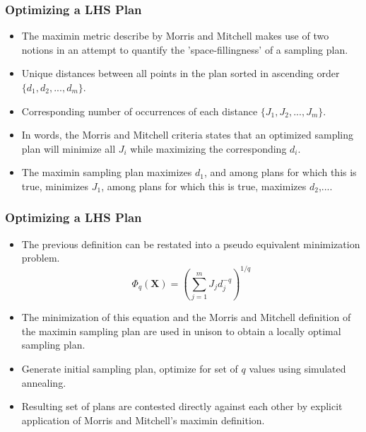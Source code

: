 \documentclass{beamer}
\begin{document}
\begin{frame}
\frametitle{Optimizing a LHS Plan}

\begin{itemize}
  \item The maximin metric describe by Morris and Mitchell makes use of two notions in an attempt to quantify the 'space-fillingness' of a sampling plan. 
  \item Unique distances between all points in the plan sorted in ascending order $\lbrace d_1, d_2, ..., d_m\rbrace$.
  \item Corresponding number of occurrences of each distance $\lbrace J_1, J_2, ..., J_m\rbrace$.  
  \item In words, the Morris and Mitchell criteria states that an optimized sampling plan will minimize all $J_i$ while maximizing the corresponding $d_i$. 
  \item The maximin sampling plan maximizes $d_1$, and among plans for which this is true, minimizes $J_1$, among plans for which this is true, maximizes $d_2$,....
\end{itemize}

\end{frame}
\begin{frame}
\frametitle{Optimizing a LHS Plan}

\begin{itemize}
  \item The previous definition can be restated into a pseudo equivalent minimization problem.
\begin{equation}
\label{eq:Phi_q}
   \Phi_q(\textbf{X}) = \left(\sum_{j=1}^m J_j d_j^{-q} \right)^{1/q} \nonumber
\end{equation}
  \item The minimization of this equation and the Morris and Mitchell definition of the maximin sampling plan are used in unison to obtain a locally optimal sampling plan.
  \item Generate initial sampling plan, optimize for set of $q$ values using simulated annealing.  
  \item Resulting set of plans are contested directly against each other by explicit application of Morris and Mitchell's maximin definition. 
\end{itemize}

\end{frame}
\end{document}
